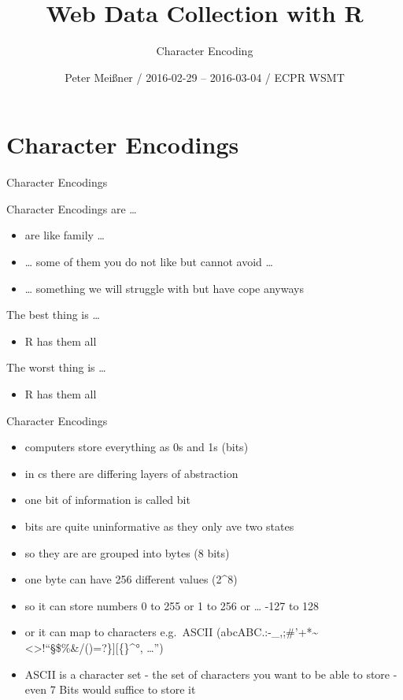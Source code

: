 \documentclass[ignorenonframetext,]{beamer}
\title{Web Data Collection with R}
\subtitle{Character Encoding}
\author{Peter Meißner / 2016-02-29 -- 2016-03-04 / ECPR WSMT}
\date{}
\providecommand{\tightlist}{%
  \setlength{\itemsep}{0pt}\setlength{\parskip}{0pt}}
\begin{document}
\frame{\titlepage}

\begin{frame}
\tableofcontents[hideallsubsections]
\end{frame}

\section{Character Encodings}\label{character-encodings}

\begin{frame}{Character Encodings}

Character Encodings are \ldots{}

\begin{itemize}
\tightlist
\item
  are like family \ldots{}
\item
  \ldots{} some of them you do not like but cannot avoid \ldots{}
\item
  \ldots{} something we will struggle with but have cope anyways
\end{itemize}

The best thing is \ldots{}

\begin{itemize}
\tightlist
\item
  R has them all
\end{itemize}

The worst thing is \ldots{}

\begin{itemize}
\tightlist
\item
  R has them all
\end{itemize}

\end{frame}

\begin{frame}{Character Encodings}

\begin{itemize}
\tightlist
\item
  computers store everything as 0s and 1s (bits)
\item
  in cs there are differing layers of abstraction
\item
  one bit of information is called bit
\item
  bits are quite uninformative as they only ave two states
\item
  so they are are grouped into bytes (8 bits)
\item
  one byte can have 256 different values (2\^{}8)
\item
  so it can store numbers 0 to 255 or 1 to 256 or \ldots{} -127 to 128
\item
  or it can map to characters e.g.~ASCII
  (abcABC.:-\_,;\#'+*\textasciitilde{}\textbar{}\textless{}\textgreater{}!``§\$\%\&/()=?\}{]}{[}\{\}\^{}°,
  \ldots{}'')
\item
  ASCII is a character set - the set of characters you want to be able
  to store - even 7 Bits would suffice to store it
\end{itemize}

\end{frame}
\end{document}
